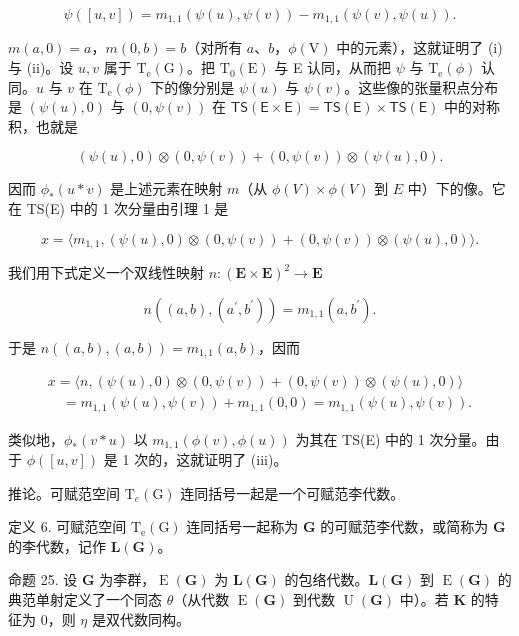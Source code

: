 \[
\psi ([ u, v ]) = m _ {1, 1} (\psi (u), \psi (v)) - m _ {1, 1} (\psi (v), \psi (u)).
\]

\(m(a,0) = a\)，\(m(0,b) = b\)（对所有 \(a\)、\(b\)，\(\phi (\mathrm{V})\) 中的元素），这就证明了 (i) 与 (ii)。设 \(u, v\) 属于 \(\mathrm{T_e(G)}\)。把 \(\mathrm{T_0(E)}\) 与 E 认同，从而把 \(\psi\) 与 \(\mathrm{T_e}(\phi)\) 认同。\(u\) 与 \(v\) 在 \(\mathrm{T_e}(\phi)\) 下的像分别是 \(\psi (u)\) 与 \(\psi (v)\)。这些像的张量积点分布是 \((\psi(u),0)\) 与 \((0,\psi (v))\) 在 \(\mathsf{TS(E\times E)} = \mathsf{TS(E)}\times \mathsf{TS(E)}\) 中的对称积，也就是

\[
(\psi (u), 0) \otimes (0, \psi (v)) + (0, \psi (v)) \otimes (\psi (u), 0).
\]

因而 \(\phi_{*} (u * v)\) 是上述元素在映射 \(m\)（从 \(\phi(V) \times \phi(V)\) 到 \(E\) 中）下的像。它在 TS(E) 中的 1 次分量由引理 1 是

\[
x = \langle m _ {1, 1}, (\psi (u), 0) \otimes (0, \psi (v)) + (0, \psi (v)) \otimes (\psi (u), 0) \rangle .
\]

我们用下式定义一个双线性映射 \(n\colon (\mathbf{E}\times \mathbf{E})^2\to \mathbf{E}\)

\[
n ((a, b), (a ^ {\prime}, b ^ {\prime})) = m _ {1, 1} (a, b ^ {\prime}).
\]

于是 \(n((a, b), (a, b)) = m_{1,1}(a, b)\)，因而

\[
\begin{array}{l} x = \langle n, (\psi (u), 0) \otimes (0, \psi (v)) + (0, \psi (v)) \otimes (\psi (u), 0) \rangle \\ \quad = m _ {1, 1} (\psi (u), \psi (v)) + m _ {1, 1} (0, 0) = m _ {1, 1} (\psi (u), \psi (v)). \end{array}
\]

类似地，\(\phi_{*} (v * u)\) 以 \(m_{1,1}(\phi(v), \phi(u))\) 为其在 TS(E) 中的 1 次分量。由于 \(\phi([u, v])\) 是 1 次的，这就证明了 (iii)。

推论。可赋范空间 \(\mathrm{T}_e(\mathrm{G})\) 连同括号一起是一个可赋范李代数。

定义 6. 可赋范空间 \(\mathrm{T_e(G)}\) 连同括号一起称为 \(\mathbf{G}\) 的可赋范李代数，或简称为 \(\mathbf{G}\) 的李代数，记作 \(\mathbf{L(G)}\)。

命题 25. 设 \(\mathbf{G}\) 为李群，\(\operatorname{E}(\mathbf{G})\) 为 \(\mathbf{L}(\mathbf{G})\) 的包络代数。\(\mathbf{L}(\mathbf{G})\) 到 \(\operatorname{E}(\mathbf{G})\) 的典范单射定义了一个同态 \(\theta\)（从代数 \(\operatorname{E}(\mathbf{G})\) 到代数 \(\operatorname{U}(\mathbf{G})\) 中）。若 \(\mathbf{K}\) 的特征为 \(0\)，则 \(\eta\) 是双代数同构。

